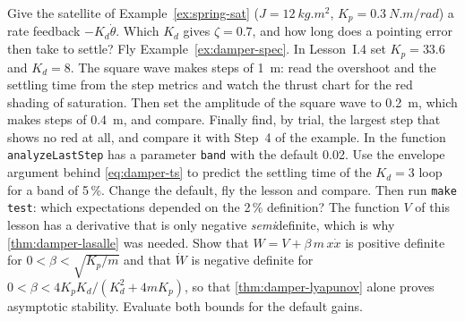 \begin{exercises}
\exercise[2] Give the satellite of Example~\ref{ex:spring-sat} ($J = \SI{12}{kg.m^2}$, $K_p = \SI{0.3}{N.m/rad}$) a rate feedback $-K_d\dot\theta$. Which $K_d$ gives $\zeta = 0.7$, and how long does a pointing error then take to settle?
\exercise[2] Fly Example~\ref{ex:damper-spec}. In Lesson~I.4 set $K_p = 33.6$ and $K_d = 8$. The square wave makes steps of \SI{1}{m}: read the overshoot and the settling time from the step metrics and watch the thrust chart for the red shading of saturation. Then set the amplitude of the square wave to \SI{0.2}{m}, which makes steps of \SI{0.4}{m}, and compare. Finally find, by trial, the largest step that shows no red at all, and compare it with Step~4 of the example.
\exercise[2] In  the function \texttt{analyzeLastStep} has a parameter \texttt{band} with the default 0.02. Use the envelope argument behind \cref{eq:damper-ts} to predict the settling time of the $K_d = 3$ loop for a band of 5\,\%. Change the default, fly the lesson and compare. Then run \texttt{make test}: which expectations depended on the 2\,\% definition?
\exercise[3] The function $V$ of this lesson has a derivative that is only negative \emph{semi}definite, which is why \cref{thm:damper-lasalle} was needed. Show that $W = V + \beta\,m\,x\dot x$ is positive definite for $0 < \beta < \sqrt{K_p/m}$ and that $\dot W$ is negative definite for $0 < \beta < 4K_pK_d/(K_d^2 + 4mK_p)$, so that \cref{thm:damper-lyapunov} alone proves asymptotic stability. Evaluate both bounds for the default gains.
\end{exercises}
